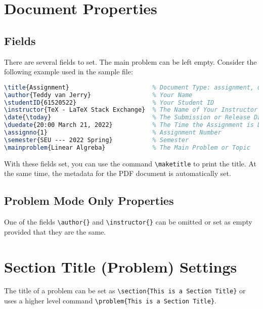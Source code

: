 \documentclass[twoside]{seu-ml-assign}
\begin{document}
  \section{Document Properties}

    \subsection{Fields}

      There are several fields to set.
      The main problem can be left empty.
      Consider the following example used in the sample file:
      \begin{lstlisting}[language=tex,numbers=none]
\title{Assignment}                       % Document Type: assignment, quiz, etc.
\author{Teddy van Jerry}                 % Your Name
\studentID{61520522}                     % Your Student ID
\instructor{TeX - LaTeX Stack Exchange}  % The Name of Your Instructor
\date{\today}                            % The Submission or Release Date
\duedate{20:00 March 21, 2022}           % The Time the Assignment is Due
\assignno{1}                             % Assignment Number
\semester{SEU --- 2022 Spring}           % Semester
\mainproblem{Linear Algreba}             % The Main Problem or Topic
      \end{lstlisting}
    
      With these fields set, you can use the command \verb|\maketitle| to print the title.
      At the same time, the metadata for the PDF document is automatically set.

    \subsection{Problem Mode Only Properties}\label{subsec:prob_only_properties}
    One of the fields \verb|\author{}| and \verb|\instructor{}| can be omitted or set as empty provided that they are the same.

  \section{Section Title (Problem) Settings}


      The title of a problem can be set as \verb|\section{This is a Section Title}| or uses a higher level command \verb|\problem{This is a Section Title}|.
\end{document}

